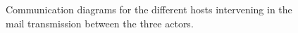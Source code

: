\begin{figure}[p]
	\centering

	\\[10mm]

	\\[5mm]

	\caption{Communication diagrams for the different hosts intervening in the mail transmission between the three actors.}
	\label{fig:mail}
\end{figure}

